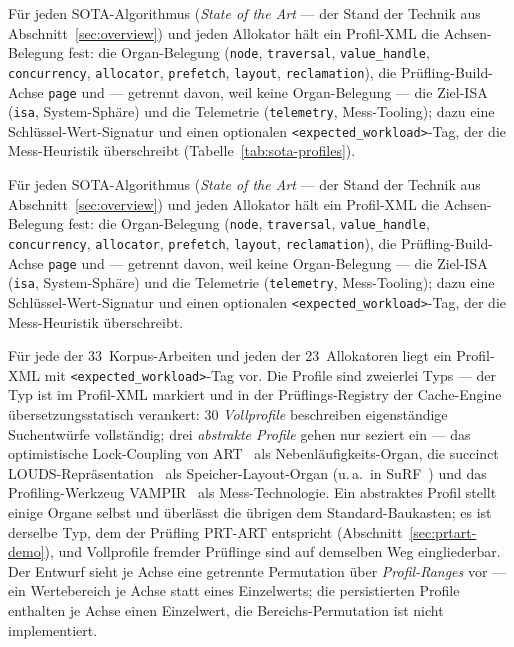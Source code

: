 \begin{nurlang}
Für jeden SOTA-Algorithmus (\emph{State of the Art} --- der Stand der Technik aus
Abschnitt~\ref{sec:overview}) und jeden Allokator hält ein Profil-XML die Achsen-Belegung fest: die
Organ-Belegung (\texttt{node}, \texttt{traversal}, \texttt{value\_handle}, \texttt{concurrency},
\texttt{allocator}, \texttt{prefetch}, \texttt{layout}, \texttt{reclamation}), die Prüfling-Build-Achse
\texttt{page} und --- getrennt davon, weil keine Organ-Belegung --- die Ziel-ISA (\texttt{isa},
System-Sphäre) und die Telemetrie (\texttt{telemetry}, Mess-Tooling); dazu eine Schlüssel-Wert-Signatur
und einen optionalen \texttt{<expected\_workload>}-Tag, der die Mess-Heuristik überschreibt
(Tabelle~\ref{tab:sota-profiles}).
\end{nurlang}
\begin{nurkurz}
Für jeden SOTA-Algorithmus (\emph{State of the Art} --- der Stand der Technik aus
Abschnitt~\ref{sec:overview}) und jeden Allokator hält ein Profil-XML die Achsen-Belegung fest: die
Organ-Belegung (\texttt{node}, \texttt{traversal}, \texttt{value\_handle}, \texttt{concurrency},
\texttt{allocator}, \texttt{prefetch}, \texttt{layout}, \texttt{reclamation}), die Prüfling-Build-Achse
\texttt{page} und --- getrennt davon, weil keine Organ-Belegung --- die Ziel-ISA (\texttt{isa},
System-Sphäre) und die Telemetrie (\texttt{telemetry}, Mess-Tooling); dazu eine Schlüssel-Wert-Signatur
und einen optionalen \texttt{<expected\_workload>}-Tag, der die Mess-Heuristik überschreibt.
\end{nurkurz}

Für jede der 33~Korpus-Arbeiten und jeden der 23~Allokatoren liegt ein Profil-XML mit
\texttt{<expected\_workload>}-Tag vor. Die Profile sind zweierlei Typs --- der Typ ist im Profil-XML
markiert und in der Prüflings-Registry der Cache-Engine übersetzungsstatisch verankert: 30
\emph{Vollprofile} beschreiben eigenständige Suchentwürfe vollständig; drei \emph{abstrakte Profile}
gehen nur seziert ein --- das optimistische Lock-Coupling von ART~\cite{leis2016olc} als
Nebenläufigkeits-Organ, die succinct LOUDS-Repräsentation~\cite{jacobson1989louds} als
Speicher-Layout-Organ (u.\,a.\ in SuRF~\cite{zhang2018surf}) und das Profiling-Werkzeug
VAMPIR~\cite{berthold2023vampir} als Mess-Technologie. Ein abstraktes Profil stellt einige Organe selbst
und überlässt die übrigen dem Standard-Baukasten; es ist derselbe Typ, dem der Prüfling PRT-ART
entspricht (Abschnitt~\ref{sec:prtart-demo}), und Vollprofile fremder Prüflinge sind auf demselben Weg
eingliederbar. Der Entwurf sieht je Achse eine getrennte Permutation über
\emph{Profil-Ranges} vor --- ein Wertebereich je Achse statt eines Einzelwerts; die persistierten
Profile enthalten je Achse einen Einzelwert, die Bereichs-Permutation ist nicht implementiert.

